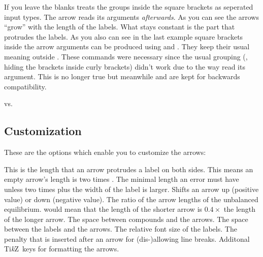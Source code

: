 \documentclass[load-preamble+]{cnltx-doc}
\newcommand*\TikZ{Ti\textit{k}Z}
\begin{document}
If you leave the blanks \chemformula{} treats the groups inside the square
brackets as seperated input types.  The arrow reads its arguments
\emph{afterwards}.  As you can see the arrows \enquote{grow} with the length
of the labels.  What stays constant is the part that protrudes the labels.  As
you also can see in the last example square brackets inside the arrow
arguments can be produced using \cs*{[} and \cs*{]}.  They keep their usual
meaning outside .  These commands were necessary since the usual
grouping (\ie, hiding the brackets inside curly brackets) didn't work due to
the way  read its argument.  This is no longer true but meanwhile
\cs*{[} and \cs*{]} are kept for backwards compatibility.
\begin{example}
   \par
   \par
   \par
   \par
  \setatomsep{15pt}
   \par
   vs. 
\end{example}

\subsection{Customization}
These are the options which enable you to customize the arrows:
\begin{options}
  \Default{.75em}
    This is the length that an arrow protrudes a label on both sides.  This
    means an empty arrow's length is two times .
  \Default{0pt}
    The minimal length an error must have unless two times
     plus the width of the label is larger.
  \Default{0pt}
    Shifts an arrow up (positive value) or down (negative value).
    The ratio of the arrow lengths of the unbalanced equilibrium.  
    would mean that the length of the shorter arrow is $0.4\times$ the length
    of the longer arrow.
  \Default{.5em}
    The space between compounds and the arrows.
  \Default{2pt}
    The space between the labels and the arrows.
    The relative font size of the labels.
    The penalty that is inserted after an arrow for
    (dis-)allowing line breaks.
  \keyval{arrow-style}{\TikZ}\Default
    Additonal \TikZ\ keys for formatting the arrows.
\end{options}
\end{document}
